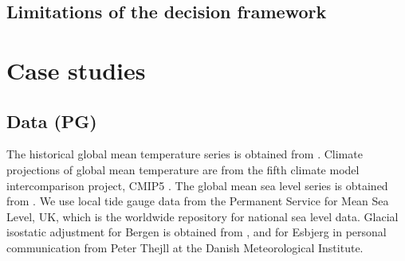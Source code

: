 \documentclass[draft,linenumbers]{agujournal}
\begin{document}

\subsection{Limitations of the decision framework}

\section{Case studies}
\label{cases}

\subsection{Data {\color{blue} (PG)}}
The historical global mean temperature series is obtained from \citet{giss}. Climate projections of global mean temperature are from the fifth climate model intercomparison project, CMIP5 \citep{cmip5}. The global mean sea level series is obtained from \citet{csiro}. We use local tide gauge data from the Permanent Service for Mean Sea Level, UK, which is the worldwide repository for national sea level data. Glacial isostatic adjustment for Bergen is obtained from \citet{Simpson2014}, and for Esbjerg in personal communication from Peter Thejll at the Danish Meteorological Institute. 
\end{document}
